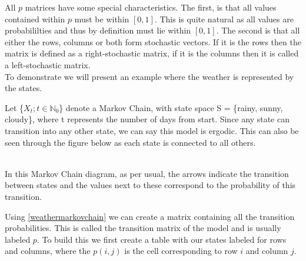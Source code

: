 All $p$ matrices have some special characteristics. The first, is that all values contained within $p$ must be within $[0,1]$.
This is quite natural as all values are probabililties and thus by definition must lie within $[0,1]$. The second is that all either the 
rows, columns or both form stochastic vectors. If it is the rows then the matrix is defined as a right-stochastic matrix, if it is 
the columns then it is called a left-stochastic matrix.  
\\

To demonstrate we will present an example where the weather is represented by the states.  

\begin{example}
\label{weathermarkovchain}
	Let \{$X_t ; t \in \mathbb{N}_0$\} denote a Markov Chain, with state space S = \{rainy, sunny, cloudy\}, where t represents the number of days from start. Since any state can transition into any 		other state, we can say this model is ergodic. This can also be seen through the figure below as each state is connected to all others. 
	
	\begin{center}
	\\
    In this Markov Chain diagram, as per usual, the arrows indicate the transition between states and the values next to these correspond to the probability of this transition. 
	\end{center}
\end{example}

Using \ref{weathermarkovchain} we can create a matrix containing all the transition probabilities. This is called the transition matrix of the model and is usually labeled $p$. To build this we first create a table with our states labeled for rows and columns, where the $p(i,j)$ is the cell corresponding to row $i$ and column $j$.

